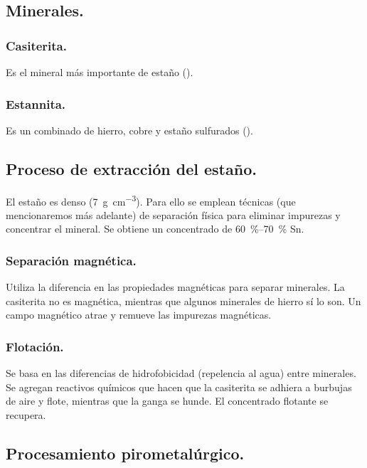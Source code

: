 \documentclass[12pt,a4paper]{article}
\begin{document}
\subsection{Minerales.}

\subsubsection{Casiterita.}

Es el mineral más importante de estaño ().

\subsubsection{Estannita.}

Es un combinado de hierro, cobre y estaño sulfurados ().

\subsection{Proceso de extracción del estaño.}

El estaño es denso (\SI{7}{\gram\per\cubic\centi\meter}). Para ello se emplean técnicas (que mencionaremos más adelante) de separación física para eliminar impurezas y concentrar el mineral. Se obtiene un concentrado de \SIrange[range-phrase = { - }, range-units=single]{60}{70}{\percent} Sn.

\subsubsection{Separación magnética.} Utiliza la diferencia en las propiedades magnéticas para separar minerales. La casiterita no es magnética, mientras que algunos minerales de hierro sí lo son. Un campo magnético atrae y remueve las impurezas magnéticas.

\subsubsection{Flotación.} Se basa en las diferencias de hidrofobicidad (repelencia al agua) entre minerales. Se agregan reactivos químicos que hacen que la casiterita se adhiera a burbujas de aire y flote, mientras que la ganga se hunde. El concentrado flotante se recupera.

\subsection{Procesamiento pirometalúrgico.}
\end{document}
